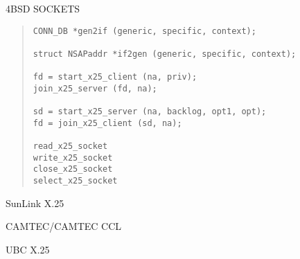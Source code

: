 \begin{bwslide}

\begin{nrtc}
\item	4BSD SOCKETS
\end{nrtc}
\end{bwslide}


\begin{bwslide}

\begin{quote}\small\begin{verbatim}
CONN_DB *gen2if (generic, specific, context);

struct NSAPaddr *if2gen (generic, specific, context);

fd = start_x25_client (na, priv);
join_x25_server (fd, na);

sd = start_x25_server (na, backlog, opt1, opt);
fd = join_x25_client (sd, na);

read_x25_socket
write_x25_socket
close_x25_socket
select_x25_socket
\end{verbatim}\end{quote}
\end{bwslide}


\begin{bwslide}

\begin{nrtc}
\item	SunLink X.25

\item	CAMTEC/CAMTEC CCL

\item	UBC X.25
\end{nrtc}
\end{bwslide}
